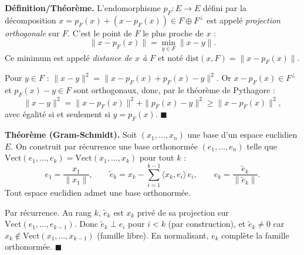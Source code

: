 
\begin{tcolorbox}[thmbox]
  \textbf{Définition/Théorème.}\enspace%
  L'endomorphisme $p_F : E \to E$ défini par la décomposition
  $x = p_F(x) + (x - p_F(x)) \in F \oplus F^\perp$
  est appelé \emph{projection orthogonale} sur $F$.
  C'est le point de $F$ le plus proche de $x$ :
  \[
    \|x - p_F(x)\| = \min_{y \in F} \|x - y\|.
  \]
  Ce minimum est appelé \emph{distance de $x$ à $F$}%
   et noté
  $\mathrm{dist}(x,F) = \|x - p_F(x)\|$.
\end{tcolorbox}

\begin{mdframed}[style=proofbar]
  Pour $y \in F$ : $\|x-y\|^2 = \|x - p_F(x) + p_F(x) - y\|^2$.
  Or $x - p_F(x) \in F^\perp$ et $p_F(x) - y \in F$ sont orthogonaux, donc,
  par le théorème de Pythagore :
  \[
    \|x-y\|^2 = \|x-p_F(x)\|^2 + \|p_F(x)-y\|^2 \geq \|x-p_F(x)\|^2,
  \]
  avec égalité si et seulement si $y = p_F(x)$. $\blacksquare$
\end{mdframed}

\decsep{}


\begin{tcolorbox}[thmbox]
  \textbf{Théorème (Gram-Schmidt).}\enspace%
  Soit $(x_1, \ldots, x_n)$ une base d'un espace euclidien $E$.
  On construit par récurrence une base orthonormée $(e_1,\ldots,e_n)$ telle que
  $\mathrm{Vect}(e_1,\ldots,e_k) = \mathrm{Vect}(x_1,\ldots,x_k)$ pour tout $k$ :
  \[
    e_1 = \frac{x_1}{\|x_1\|}, \qquad
    \tilde{e}_k = x_k - \sum_{i=1}^{k-1}\langle x_k, e_i\rangle\,e_i, \qquad
    e_k = \frac{\tilde{e}_k}{\|\tilde{e}_k\|}.
  \]
  Tout espace euclidien admet une base orthonormée.
\end{tcolorbox}

\begin{mdframed}[style=proofbar]
  Par récurrence. Au rang $k$, $\tilde{e}_k$ est $x_k$ privé de sa projection
  sur $\mathrm{Vect}(e_1,\ldots,e_{k-1})$. Donc $\tilde{e}_k \perp e_i$ pour
  $i < k$ (par construction), et $\tilde{e}_k \neq 0$ car $x_k \notin
  \mathrm{Vect}(x_1,\ldots,x_{k-1})$ (famille libre). En normalisant, $e_k$
  complète la famille orthonormée. $\blacksquare$
\end{mdframed}

